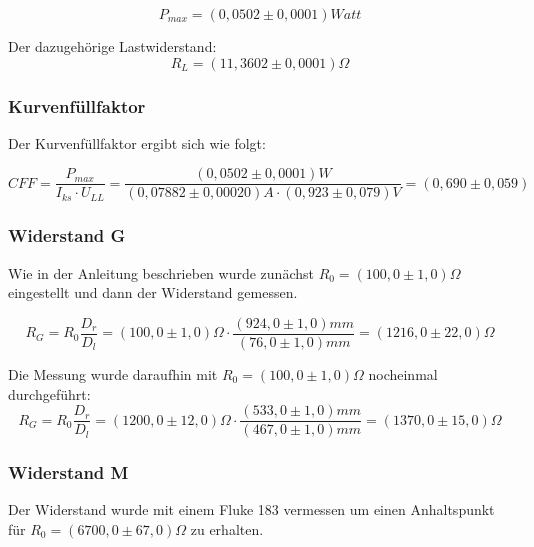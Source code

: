 \documentclass{article}
\begin{document}
$$P_{max}=(0,0502 \pm 0,0001)Watt$$

Der dazugehörige Lastwiderstand: $$R_{L}=(11,3602 \pm 0,0001) \Omega$$


\subsubsection{Kurvenfüllfaktor}

Der Kurvenfüllfaktor ergibt sich wie folgt:

$$CFF=\frac{P_{max}}{I_{ks}\cdot U_{LL}}=\frac{(0,0502 \pm 0,0001) W}{(0,07882 \pm 0,00020) A \cdot (0,923 \pm 0,079) V}=(0,690 \pm 0,059)$$


\subsubsection{Widerstand G}


Wie in der Anleitung beschrieben wurde zunächst $R_0=(100,0 \pm 1,0)\Omega$ eingestellt und dann der Widerstand gemessen.


$$R_G=R_0\frac{D_r}{D_l}=(100,0 \pm 1,0) \Omega \cdot \frac{(924,0 \pm 1,0) mm}{(76,0 \pm 1,0) mm} = (1216,0 \pm 22,0) \Omega$$

%

Die Messung wurde daraufhin mit $R_0=(100,0 \pm 1,0)\Omega$ nocheinmal durchgeführt:
$$R_G=R_0\frac{D_r}{D_l}=(1200,0 \pm 12,0) \Omega \cdot \frac{(533,0 \pm 1,0) mm}{(467,0 \pm 1,0) mm} = (1370,0 \pm 15,0) \Omega$$


\subsubsection{Widerstand M}

Der Widerstand wurde mit einem Fluke 183 vermessen um einen
Anhaltspunkt für $R_0=(6700,0 \pm 67,0)\Omega$ zu erhalten.
\end{document}
